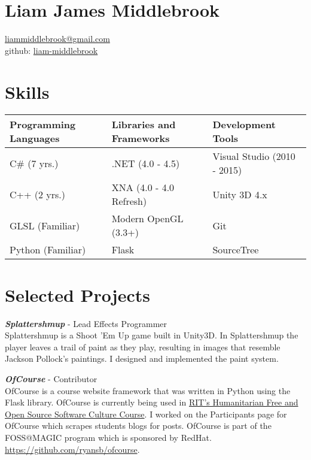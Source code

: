 \documentclass[line,margin]{res}
\begin{document}
\marginsize{.5in}{.5in}{.5in}{.5in}

\section{Liam James Middlebrook}

\href{mailto:liammiddlebrook@gmail.com}{liammiddlebrook@gmail.com}\\
github: \href{https://github.com/liam-middlebrook}{liam-middlebrook}

\begin{resume}


\section{Skills}
\begin{table}[h]
\begin{tabular}{@{}lll@{}}
\toprule
Programming Languages & Libraries and Frameworks & Development Tools           \\ \midrule
C\# (7 yrs.)          & .NET (4.0 - 4.5)         & Visual Studio (2010 - 2015) \\
C++ (2 yrs.)          & XNA (4.0 - 4.0 Refresh)  & Unity 3D 4.x                \\
GLSL (Familiar)       & Modern OpenGL (3.3+)     & Git                         \\
Python (Familiar)     & Flask                    & SourceTree                  \\ \bottomrule
\end{tabular}
\end{table}


\section{Selected Projects}

{\textbf{\emph{Splattershmup}}} - Lead Effects Programmer\\
Splattershmup is a Shoot 'Em Up game built in Unity3D. In Splattershmup the player leaves
a trail of paint as they play, resulting in images that resemble Jackson Pollock's paintings.
I designed and implemented the paint system.

{\textbf{\emph{OfCourse}}} - Contributor\\
OfCourse is a course website framework that was written in Python using the Flask library.
OfCourse is currently being used in \href{http://hfoss-fossrit.rhcloud.com}{RIT's Humanitarian
Free and Open Source Software Culture Course}. I worked on the Participants page for OfCourse
which scrapes students blogs for posts. OfCourse is part of the FOSS@MAGIC
program which is sponsored by RedHat.\\
\url{https://github.com/ryansb/ofcourse}.


\end{resume}
\end{document}
